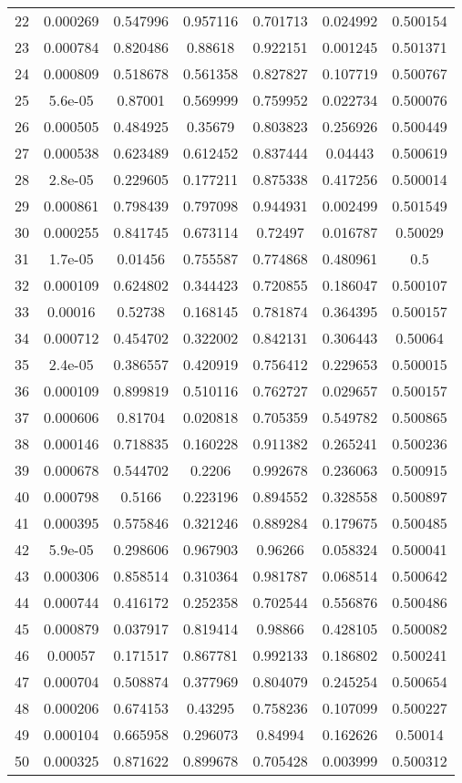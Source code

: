 \begin{table}
\begin{tabular}{c|c|c|c|c|c|c}
22 & 0.000269 & 0.547996 & 0.957116 & 0.701713 & 0.024992 & 0.500154\\
23 & 0.000784 & 0.820486 & 0.88618 & 0.922151 & 0.001245 & 0.501371\\
24 & 0.000809 & 0.518678 & 0.561358 & 0.827827 & 0.107719 & 0.500767\\
25 & 5.6e-05 & 0.87001 & 0.569999 & 0.759952 & 0.022734 & 0.500076\\
26 & 0.000505 & 0.484925 & 0.35679 & 0.803823 & 0.256926 & 0.500449\\
27 & 0.000538 & 0.623489 & 0.612452 & 0.837444 & 0.04443 & 0.500619\\
28 & 2.8e-05 & 0.229605 & 0.177211 & 0.875338 & 0.417256 & 0.500014\\
29 & 0.000861 & 0.798439 & 0.797098 & 0.944931 & 0.002499 & 0.501549\\
30 & 0.000255 & 0.841745 & 0.673114 & 0.72497 & 0.016787 & 0.50029\\
31 & 1.7e-05 & 0.01456 & 0.755587 & 0.774868 & 0.480961 & 0.5\\
32 & 0.000109 & 0.624802 & 0.344423 & 0.720855 & 0.186047 & 0.500107\\
33 & 0.00016 & 0.52738 & 0.168145 & 0.781874 & 0.364395 & 0.500157\\
34 & 0.000712 & 0.454702 & 0.322002 & 0.842131 & 0.306443 & 0.50064\\
35 & 2.4e-05 & 0.386557 & 0.420919 & 0.756412 & 0.229653 & 0.500015\\
36 & 0.000109 & 0.899819 & 0.510116 & 0.762727 & 0.029657 & 0.500157\\
37 & 0.000606 & 0.81704 & 0.020818 & 0.705359 & 0.549782 & 0.500865\\
38 & 0.000146 & 0.718835 & 0.160228 & 0.911382 & 0.265241 & 0.500236\\
39 & 0.000678 & 0.544702 & 0.2206 & 0.992678 & 0.236063 & 0.500915\\
40 & 0.000798 & 0.5166 & 0.223196 & 0.894552 & 0.328558 & 0.500897\\
41 & 0.000395 & 0.575846 & 0.321246 & 0.889284 & 0.179675 & 0.500485\\
42 & 5.9e-05 & 0.298606 & 0.967903 & 0.96266 & 0.058324 & 0.500041\\
43 & 0.000306 & 0.858514 & 0.310364 & 0.981787 & 0.068514 & 0.500642\\
44 & 0.000744 & 0.416172 & 0.252358 & 0.702544 & 0.556876 & 0.500486\\
45 & 0.000879 & 0.037917 & 0.819414 & 0.98866 & 0.428105 & 0.500082\\
46 & 0.00057 & 0.171517 & 0.867781 & 0.992133 & 0.186802 & 0.500241\\
47 & 0.000704 & 0.508874 & 0.377969 & 0.804079 & 0.245254 & 0.500654\\
48 & 0.000206 & 0.674153 & 0.43295 & 0.758236 & 0.107099 & 0.500227\\
49 & 0.000104 & 0.665958 & 0.296073 & 0.84994 & 0.162626 & 0.50014\\
50 & 0.000325 & 0.871622 & 0.899678 & 0.705428 & 0.003999 & 0.500312\\
\end{tabular}
\end{table}
